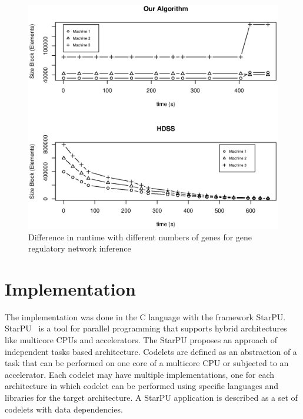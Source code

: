 \documentclass[journal]{IEEEtran}
\begin{document}
\begin{figure}[htb]
	\begin{center}
	\centering
			\includegraphics[scale=0.4]{BlocosComportamento_Fabrizio.eps}
	\caption{Difference in runtime with different numbers of genes for gene regulatory network inference}
	\label{fig:GeneBlocos}
	\end{center}
\end{figure}


\section{Implementation}

The implementation was done in the C language with the framework StarPU.
StarPU~\cite{starpu} is a tool for parallel programming that supports hybrid
architectures like multicore CPUs and accelerators. The StarPU proposes an
approach of independent tasks based architecture. Codelets are defined as an
abstraction of a task that can be performed on one core of a multicore CPU or
subjected to an accelerator. Each codelet may have multiple implementations, one
for each architecture in which codelet can be performed using specific languages
and libraries for the target architecture. A StarPU application is described as
a set of codelets with data dependencies.
\end{document}
